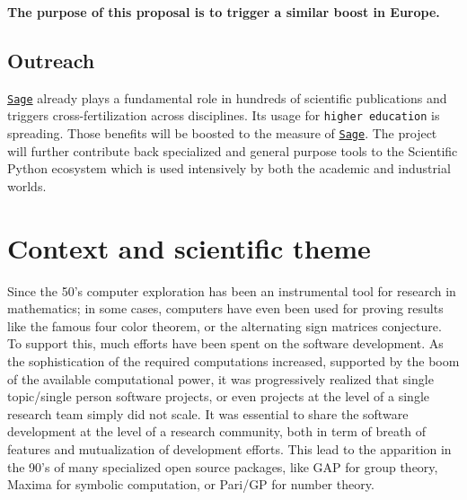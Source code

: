 \documentclass[a4,12pt]{amsart}
\newcommand{\sage}{\href{http://www.sagemath.org/}{\texttt{Sage}}\xspace}
\newcommand{\TODO}[2][To do: ]{}
\begin{document}
\medskip
\textbf{The purpose of this proposal is to trigger a similar boost in
  Europe.}

\subsection{Outreach}%

\sage{} already plays a fundamental role in hundreds of scientific
publications and triggers cross-fertilization across disciplines. Its
usage for \texttt{higher education} is spreading. Those benefits will
be boosted to the measure of \sage{}.  The project will further
contribute back specialized and general purpose tools to the
Scientific Python ecosystem which is used intensively by both the
academic and industrial worlds.


\clearpage

\section{Context and scientific theme}


Since the 50's computer exploration has been an instrumental tool for
research in mathematics; in some cases, computers have even been used for
proving results like the famous four color theorem, or the
alternating sign matrices conjecture.
To support this, much efforts have been spent on the software
development. As the sophistication of the required computations
increased, supported by the boom of the available computational power,
it was progressively realized that single topic/single person software
projects, or even projects at the level of a single research team
simply did not scale. It was essential to share the software
development at the level of a research community, both in term of
breath of features and mutualization of development efforts. This lead
to the apparition in the 90's of many specialized open source
packages, like GAP for group theory, Maxima for symbolic computation, or
Pari/GP for number theory.
\end{document}
